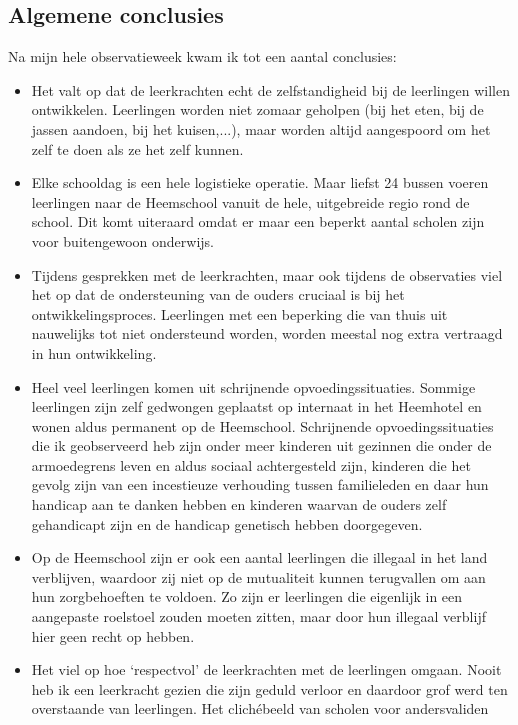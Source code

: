 \documentclass[a4paper,11pt]{article}
\theoremstyle{definition}
\begin{document}
\subsection{Algemene conclusies}
Na mijn hele observatieweek kwam ik tot een aantal conclusies:
\begin{itemize}
  \item Het valt op dat de leerkrachten echt de zelfstandigheid bij de 
  leerlingen willen ontwikkelen. Leerlingen worden niet zomaar geholpen (bij het eten, bij de jassen aandoen, bij het kuisen,...), maar 
  worden altijd aangespoord om het zelf te doen als ze het zelf kunnen.
  \item Elke schooldag is een hele logistieke operatie. Maar liefst 24 bussen 
  voeren leerlingen naar de Heemschool vanuit de hele, uitgebreide regio rond de school. 
  Dit komt uiteraard omdat er maar een beperkt aantal scholen zijn voor 
  buitengewoon onderwijs. 
    \item Tijdens gesprekken met de leerkrachten, maar ook tijdens de observaties 
  viel het op dat de ondersteuning van de ouders cruciaal is bij het 
  ontwikkelingsproces. Leerlingen met een beperking die van thuis uit nauwelijks 
  tot niet ondersteund worden, worden meestal nog extra vertraagd in hun 
  ontwikkeling.
  \item Heel veel leerlingen komen uit schrijnende opvoedingssituaties. Sommige 
  leerlingen zijn zelf gedwongen geplaatst op internaat in het Heemhotel en 
  wonen aldus permanent op de Heemschool. Schrijnende opvoedingssituaties die ik geobserveerd heb zijn 
  onder meer kinderen uit gezinnen die onder de armoedegrens leven en aldus sociaal 
  achtergesteld zijn, kinderen die het gevolg zijn van een incestieuze 
  verhouding tussen familieleden en daar hun handicap aan te danken hebben en 
  kinderen waarvan de ouders zelf gehandicapt zijn en de handicap genetisch hebben doorgegeven. 
  \item Op de Heemschool zijn er ook een aantal leerlingen die illegaal in het land verblijven, waardoor zij niet op de mutualiteit kunnen terugvallen om aan hun zorgbehoeften te voldoen.
  Zo zijn er leerlingen die eigenlijk in een aangepaste roelstoel zouden moeten zitten, 
  maar door hun illegaal verblijf hier geen recht op hebben.
  \item Het viel op hoe `respectvol' de leerkrachten met de leerlingen omgaan. 
  Nooit heb ik een leerkracht gezien die zijn geduld verloor en daardoor grof 
  werd ten overstaande van leerlingen. Het clichébeeld van scholen voor andersvaliden 

\end{itemize}
\end{document}
